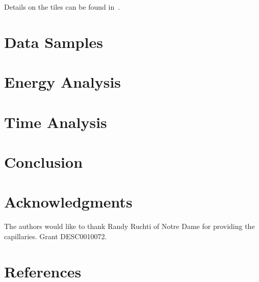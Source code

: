 \documentclass[review]{elsarticle}
\begin{document}
Details on the tiles can be found in~\cite{mdliquidtile}.

\section{Data Samples}
\label{sec:data_samples}


\section{Energy Analysis}


\section{Time Analysis}


\section{Conclusion}





\section{Acknowledgments}
The authors would like to thank Randy Ruchti of Notre Dame for
providing the capillaries. 
Grant DESC0010072.

\section*{References}


\end{document}
